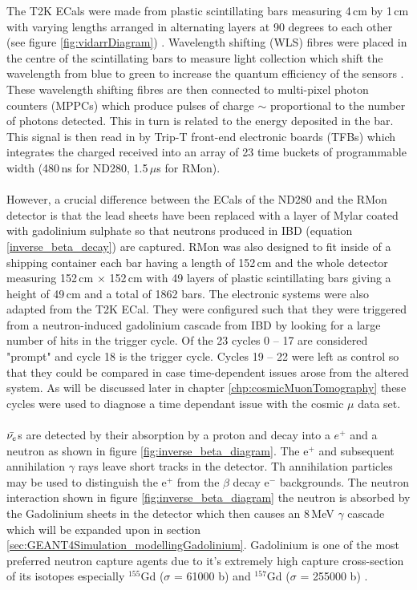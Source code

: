 The T2K ECals were made from plastic scintillating bars measuring 4\,cm by 1\,cm with varying lengths arranged in alternating layers at 90 degrees to each other (see figure \ref{fig:vidarrDiagram}) \cite{Allan_2013}. Wavelength shifting (WLS) fibres were placed in the centre of the scintillating bars to measure light collection which shift the wavelength from blue to green to increase the quantum efficiency of the sensors \cite{Allan_2013}. These wavelength shifting fibres are then connected to multi-pixel photon counters (MPPCs) which produce pulses of charge $\sim$ proportional to the number of photons detected. This in turn is related to the energy deposited in the bar. This signal is then read in by Trip-T front-end electronic boards (TFBs) which integrates the charged received into an array of 23 time buckets of programmable width (480\,ns for ND280, 1.5\,$\mu$s for RMon). 
\\\\However, a crucial difference between the ECals of the ND280 and the RMon detector is that the lead sheets have been replaced with a layer of Mylar coated with gadolinium sulphate so that neutrons produced in IBD (equation \ref{inverse_beta_decay}) are captured. RMon was also designed to fit inside of a shipping container each bar having a length of 152\,cm and the whole detector measuring 152\,cm $\times$ 152\,cm with 49 layers of plastic scintillating bars giving a height of 49\,cm and a total of 1862 bars. The electronic systems were also adapted from the T2K ECal. They were configured such that they were triggered from a neutron-induced gadolinium cascade from IBD by looking for a large number of hits in the trigger cycle. Of the 23 cycles 0 -- 17 are considered "prompt" and cycle 18 is the trigger cycle. Cycles 19 -- 22 were left as control so that they could be compared in case time-dependent issues arose from the altered system. As will be discussed later in chapter \ref{chp:cosmicMuonTomography} these cycles were used to diagnose a time dependant issue with the cosmic $\mu$ data set.
\\\\$\Bar{\nu_e}$s are detected by their absorption by a proton and decay into a $e^+$ and a neutron as shown in figure \ref{fig:inverse_beta_diagram}. The e$^+$ and subsequent annihilation $\gamma$ rays leave short tracks in the detector. Th annihilation particles may be used to distinguish the e$^+$ from the $\beta$ decay e$^-$ backgrounds. The neutron interaction shown in figure \ref{fig:inverse_beta_diagram} the neutron is absorbed by the Gadolinium sheets in the detector which then causes an 8\,MeV $\gamma$ cascade which will be expanded upon in section \ref{sec:GEANT4Simulation_modellingGadolinium}. Gadolinium is one of the most preferred neutron capture agents due to it's extremely high capture cross-section of its isotopes especially $^{155}$Gd ($\sigma$ = 61000 b) and $^{157}$Gd ($\sigma$ = 255000 b) \cite{gadFoilsThermalNeut}. 

